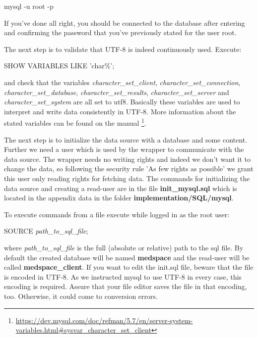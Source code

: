 \begin{codebox}
	mysql -u root -p 
\end{codebox}

If you've done all right, you should be connected to the database after entering and confirming the password that you've previously stated for the user root.

The next step is to validate that UTF-8 is indeed continuously used. Execute:

\begin{codebox}
	SHOW VARIABLES LIKE 'char\%';
\end{codebox}

and check that the variables \emph{character\_set\_client}, \emph{character\_set\_connection}, \emph{character\_set\_database}, \emph{character\_set\_results}, \emph{character\_set\_server} and \emph{character\_set\_system} are all set to utf8.
Basically these variables are used to interpret and write data consistently in UTF-8. More information about the stated variables can be found on the manual
\footnote{\url{https://dev.mysql.com/doc/refman/5.7/en/server-system-variables.html\#sysvar_character_set_client}}.

The next step is to initialize the data source with a database and some content. Further we need a user which is used by the wrapper to communicate with the data source. The wrapper needs no writing rights and indeed we don't want it to change the data, so following the security rule 'As few rights as possible' we grant this user only reading rights for fetching data. The commands for initializing the data source and creating a read-user are in the file \textbf{init\_mysql.sql} which is located in the appendix data in the folder \textbf{implementation/SQL/mysql}.

To execute commands from a file execute while logged in as the root user:

\begin{codebox}
	SOURCE \emph{path\_to\_sql\_file};
\end{codebox}

where \emph{path\_to\_sql\_file} is the full (absolute or relative) path to the sql file.
By default the created database will be named \textbf{medspace} and the read-user will be called \textbf{medspace\_client}. If you want to edit the init.sql file, beware that the file is encoded in UTF-8. As we instructed mysql to use UTF-8 in every case, this encoding is required. Assure that your file editor saves the file in that encoding, too. Otherwise, it could come to conversion errors.


